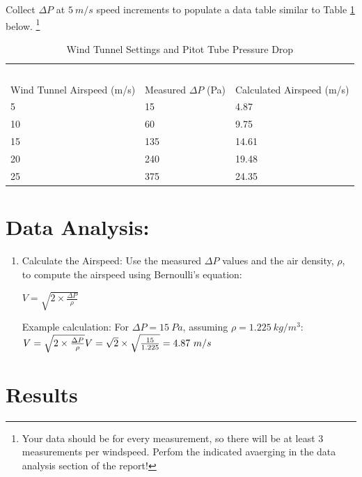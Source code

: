 \documentclass[12pt]{article}
\begin{document}
Collect $\Delta P$ at $5~m/s$ speed increments to populate a data table similar to Table \ref{tab:datatable} below. \footnote{Your data should be for every measurement, so there will be at least 3 measurements per windspeed. Perfom the indicated avaerging in the data analysis section of the report!}
\begin{table}[h!]
\centering
\caption{Wind Tunnel Settings and Pitot Tube Pressure Drop}
\begin{tabular}{p{1.5in}p{1.5in}p{1.5in}}
~&~&~\\
Wind Tunnel Airspeed (m/s)&Measured $\Delta P$ (Pa)&Calculated Airspeed (m/s)\\
\hline
\hline
5&15&4.87\\
10&60&9.75\\
15&135&14.61\\
20&240&19.48\\
25&375&24.35\\
\hline
\end{tabular}
\label{tab:datatable}
\end{table}
\clearpage

\section{Data Analysis:}
\begin{enumerate}

\item Calculate the Airspeed:
Use the measured $\Delta P$ values and the air density, $\rho$, to compute the airspeed using Bernoulli’s equation:

\begin{math}
V=\sqrt{2 \times \frac{\Delta P}{\rho}}
\end{math}

Example calculation: For $\Delta P =15~Pa$, assuming $\rho=1.225~kg/m^3$:\\

\begin{math}
V=\sqrt{2\times \frac{\Delta P}{\rho}}
V=\sqrt{2} \times \sqrt{\frac{15}{1.225}} = 4.87~m/s \\
\end{math}


\end{enumerate}
\clearpage

\section{Results}
\end{document}
